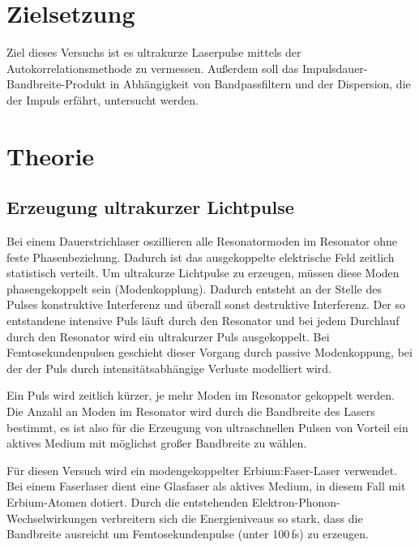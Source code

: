 \section{Zielsetzung}
Ziel dieses Versuchs ist es ultrakurze Laserpulse mittels der Autokorrelationsmethode zu vermessen.
Außerdem soll das Impulsdauer-Bandbreite-Produkt in Abhängigkeit von Bandpassfiltern und
der Dispersion, die der Impuls erfährt, untersucht werden.
\section{Theorie}
\subsection{Erzeugung ultrakurzer Lichtpulse}
Bei einem Dauerstrichlaser oszillieren alle Resonatormoden im Resonator ohne 
feste Phasenbeziehung. Dadurch ist das ausgekoppelte elektrische Feld zeitlich statistisch verteilt.
Um ultrakurze Lichtpulse zu erzeugen, müssen diese Moden phasengekoppelt sein (Modenkopplung).
Dadurch entsteht an der Stelle des Pulses konstruktive Interferenz und überall sonst destruktive Interferenz.
Der so entstandene intensive Puls läuft durch den Resonator und bei jedem Durchlauf durch den Resonator wird ein ultrakurzer Puls ausgekoppelt.
Bei Femtosekundenpulsen geschieht dieser Vorgang durch passive Modenkoppung, bei der der Puls durch intensitätsabhängige Verluste modelliert wird.

Ein Puls wird zeitlich kürzer, je mehr Moden im Resonator gekoppelt werden. Die Anzahl an Moden im Resonator wird durch die Bandbreite des Lasers bestimmt, es ist also für die Erzeugung
von ultraschnellen Pulsen von Vorteil ein aktives Medium mit möglichst großer Bandbreite zu wählen.

Für diesen Versuch wird ein modengekoppelter Erbium:Faser-Laser verwendet.
Bei einem Faserlaser dient eine Glasfaser als aktives Medium, in diesem Fall mit Erbium-Atomen dotiert.
Durch die entstehenden Elektron-Phonon-Wechselwirkungen verbreitern sich die Energieniveaus so stark, dass 
die Bandbreite ausreicht um Femtosekundenpulse (unter 100$\,$fs) zu erzeugen.

